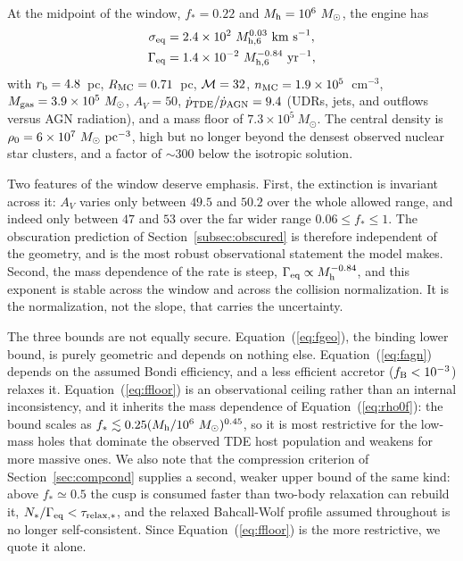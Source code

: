 \documentclass[preprint2]{aastex}
\newcommand{\msun}{M_{\odot}\xspace}
\newcommand{\mhsix}{M_{\rm h,6}\xspace}
\begin{document}
At the midpoint of the window, $f_{\ast} = 0.22$ and $M_{\rm h} = 10^{6}~\msun$, the engine has
\begin{equation}
\begin{split}
\sigma_{\rm eq} &= 2.4 \times 10^{2}~\mhsix^{0.03}~{\rm km~s}^{-1}, \\
\Gamma_{\rm eq} &= 1.4 \times 10^{-2}~\mhsix^{-0.84}~{\rm yr}^{-1},
\end{split}\label{eq:eqwindow}
\end{equation}
with $r_{\rm b} = 4.8$~pc, $R_{\rm MC} = 0.71$~pc, ${\cal M} = 32$, $n_{\rm MC} = 1.9\times10^{5}$~cm$^{-3}$, $M_{\rm gas} = 3.9\times10^{5}~\msun$, $A_{V} = 50$, $\dot{p}_{\rm TDE}/\dot{p}_{\rm AGN} = 9.4$ (UDRs, jets, and outflows versus AGN radiation), and a mass floor of $7.3 \times 10^{5}~\msun$. The central density is $\rho_{0} = 6 \times 10^{7}~\msun~{\rm pc}^{-3}$, high but no longer beyond the densest observed nuclear star clusters, and a factor of $\sim 300$ below the isotropic solution.

Two features of the window deserve emphasis. First, the extinction is invariant across it: $A_{V}$ varies only between $49.5$ and $50.2$ over the whole allowed range, and indeed only between $47$ and $53$ over the far wider range $0.06 \le f_{\ast} \le 1$. The obscuration prediction of Section~\ref{subsec:obscured} is therefore independent of the geometry, and is the most robust observational statement the model makes. Second, the mass dependence of the rate is steep, $\Gamma_{\rm eq} \propto M_{\rm h}^{-0.84}$, and this exponent is stable across the window and across the collision normalization. It is the normalization, not the slope, that carries the uncertainty.

The three bounds are not equally secure. Equation~(\ref{eq:fgeo}), the binding lower bound, is purely geometric and depends on nothing else. Equation~(\ref{eq:fagn}) depends on the assumed Bondi efficiency, and a less efficient accretor ($f_{\rm B} < 10^{-3}$) relaxes it. Equation~(\ref{eq:ffloor}) is an observational ceiling rather than an internal inconsistency, and it inherits the mass dependence of Equation~(\ref{eq:rho0f}): the bound scales as $f_{\ast} \lesssim 0.25 (M_{\rm h}/10^{6}~\msun)^{0.45}$, so it is most restrictive for the low-mass holes that dominate the observed TDE host population and weakens for more massive ones. We also note that the compression criterion of Section~\ref{sec:compcond} supplies a second, weaker upper bound of the same kind: above $f_{\ast} \simeq 0.5$ the cusp is consumed faster than two-body relaxation can rebuild it, $N_{\ast}/\Gamma_{\rm eq} < \tau_{\rm relax,\ast}$, and the relaxed Bahcall-Wolf profile assumed throughout is no longer self-consistent. Since Equation~(\ref{eq:ffloor}) is the more restrictive, we quote it alone.
\end{document}
